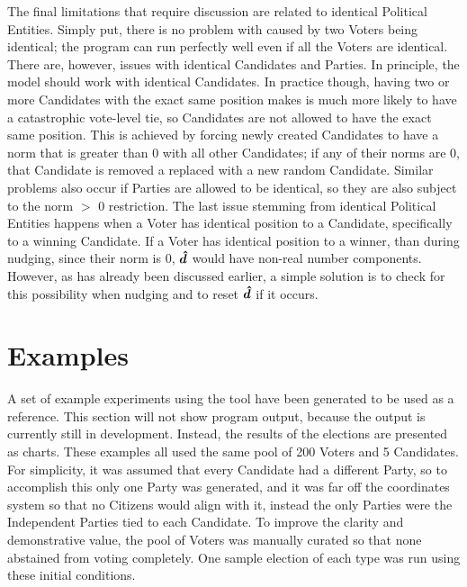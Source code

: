 \documentclass[12pt]{article}
\begin{document}
\qquad The final limitations that require discussion are related to identical Political Entities. Simply put, there is no problem with caused by two Voters being identical; the program can run perfectly well even if all the Voters are identical. There are, however, issues with identical Candidates and Parties. In principle, the model should work with identical Candidates. In practice though, having two or more Candidates with the exact same position makes is much more likely to have a catastrophic vote-level tie, so Candidates are not allowed to have the exact same position. This is achieved by forcing newly created Candidates to have a norm that is greater than 0 with all other Candidates; if any of their norms are 0, that Candidate is removed a replaced with a new random Candidate. Similar problems also occur if Parties are allowed to be identical, so they are also subject to the norm $>$ 0 restriction. The last issue stemming from identical Political Entities happens when a Voter has identical position to a Candidate, specifically to a winning Candidate. If a Voter has identical position to a winner, than during nudging, since their norm is 0, $\bm{\hat{d}}$ would have non-real number components. However, as has already been discussed earlier, a simple solution is to check for this possibility when nudging and to reset $\bm{\hat{d}}$ if it occurs. \\

\section{Examples} \label{Examples}

\qquad A set of example experiments using the tool have been generated to be used as a reference. This section will not show program output, because the output is currently still in development. Instead, the results of the elections are presented as charts. These examples all used the same pool of 200 Voters and 5 Candidates. For simplicity, it was assumed that every Candidate had a different Party, so to accomplish this only one Party was generated, and it was far off the coordinates system so that no Citizens would align with it, instead the only Parties were the Independent Parties tied to each Candidate. To improve the clarity and demonstrative value, the pool of Voters was manually curated so that none abstained from voting completely. One sample election of each type was run using these initial conditions.\\
\end{document}
